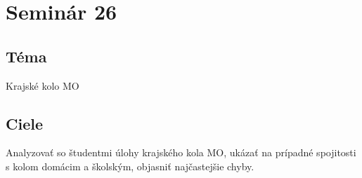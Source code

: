 \section*{Seminár 26}
\subsection*{Téma}
Krajské kolo MO

\subsection{Ciele}
Analyzovať so študentmi úlohy krajského kola MO, ukázať na prípadné spojitosti s kolom domácim a školským, objasniť najčastejšie chyby.

